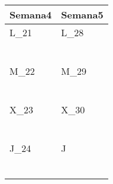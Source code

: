 	\renewcommand{\arraystretch}{1.25}\scriptsize
	\begin{longtabu} to \textwidth { X[l] X[l]}
		\centering \textbf{Semana4} &  \centering\textbf{Semana5}  \\
		\toprule
		L_{21} & L_{28} \\
		\makebox{$\square$}\dotfill & \makebox{$\square$}\dotfill \\
		\dotfill & \dotfill \\
		\makebox{$\square$}\dotfill & \makebox{$\square$}\dotfill \\
		\dotfill & \dotfill \\
		\makebox{$\square$}\dotfill & \makebox{$\square$}\dotfill \\
		\dotfill & \dotfill \\

		\hline

		M_{22} & M_{29} \\
		\makebox{$\square$}\dotfill & \makebox{$\square$}\dotfill \\
		\dotfill & \dotfill \\
		\makebox{$\square$}\dotfill & \makebox{$\square$}\dotfill \\
		\dotfill & \dotfill \\
		\makebox{$\square$}\dotfill & \makebox{$\square$}\dotfill \\
		\dotfill & \dotfill \\

		\hline

		X_{23} & X_{30} \\
		\makebox{$\square$}\dotfill & \makebox{$\square$}\dotfill \\
		\dotfill & \dotfill \\
		\makebox{$\square$}\dotfill & \makebox{$\square$}\dotfill \\
		\dotfill & \dotfill \\
		\makebox{$\square$}\dotfill & \makebox{$\square$}\dotfill \\
		\dotfill & \dotfill \\

		\hline

		J_{24} & J \\
		\makebox{$\square$}\dotfill &   \\
		\dotfill &   \\
		\makebox{$\square$}\dotfill &   \\
		\dotfill &   \\
		\makebox{$\square$}\dotfill &   \\
		\dotfill &   \\


\end{longtabu}
